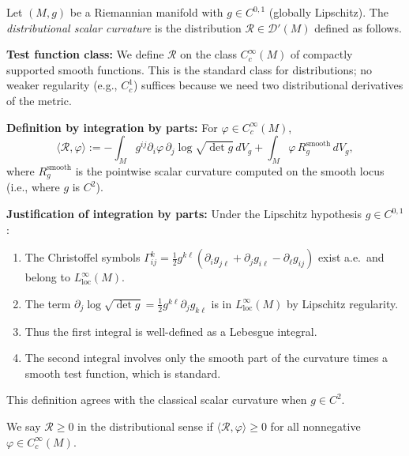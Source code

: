 \begin{definition}\label{def:MeasureCurvature}
Let $(M, g)$ be a Riemannian manifold with $g \in C^{0,1}$ (globally Lipschitz). The \emph{distributional scalar curvature} is the distribution $\mathcal{R} \in \mathcal{D}'(M)$ defined as follows.

\textbf{Test function class:} We define $\mathcal{R}$ on the class $C^\infty_c(M)$ of compactly supported smooth functions. This is the standard class for distributions; no weaker regularity (e.g., $C^1_c$) suffices because we need two distributional derivatives of the metric.

\textbf{Definition by integration by parts:} For $\varphi \in C^\infty_c(M)$,
\begin{equation}
    \langle \mathcal{R}, \varphi \rangle := -\int_M g^{ij} \partial_i \varphi \, \partial_j \log \sqrt{\det g} \, dV_g + \int_M \varphi \, R_g^{\text{smooth}} \, dV_g,
\end{equation}
where $R_g^{\text{smooth}}$ is the pointwise scalar curvature computed on the smooth locus (i.e., where $g$ is $C^2$).

\textbf{Justification of integration by parts:} Under the Lipschitz hypothesis $g \in C^{0,1}$:
\begin{enumerate}
    \item The Christoffel symbols $\Gamma^k_{ij} = \frac{1}{2} g^{k\ell}(\partial_i g_{j\ell} + \partial_j g_{i\ell} - \partial_\ell g_{ij})$ exist a.e.\ and belong to $L^\infty_{\mathrm{loc}}(M)$.
    \item The term $\partial_j \log \sqrt{\det g} = \frac{1}{2} g^{k\ell} \partial_j g_{k\ell}$ is in $L^\infty_{\mathrm{loc}}(M)$ by Lipschitz regularity.
    \item Thus the first integral is well-defined as a Lebesgue integral.
    \item The second integral involves only the smooth part of the curvature times a smooth test function, which is standard.
\end{enumerate}
This definition agrees with the classical scalar curvature when $g \in C^2$.

We say $\mathcal{R} \ge 0$ in the distributional sense if $\langle \mathcal{R}, \varphi \rangle \ge 0$ for all nonnegative $\varphi \in C^\infty_c(M)$.
\end{definition}

